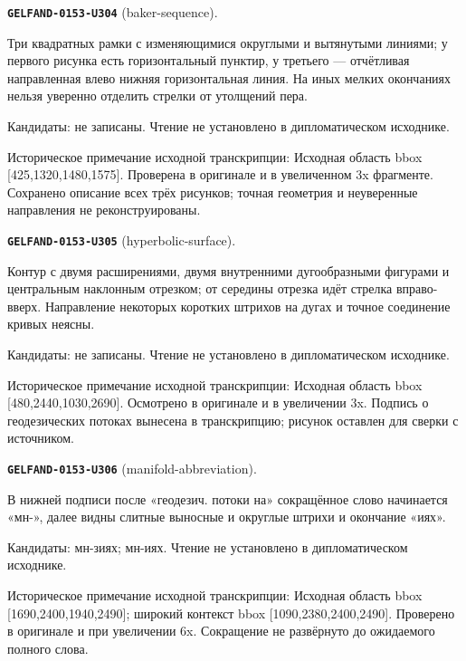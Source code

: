 \par\noindent\leavevmode{}\label{GELFAND-0153-U304}\textbf{\texttt{GELFAND-0153-U304}} (baker-sequence).\nopagebreak[4]\par
Три квадратных рамки с изменяющимися округлыми и вытянутыми линиями; у первого рисунка есть горизонтальный пунктир, у третьего — отчётливая направленная влево нижняя горизонтальная линия. На иных мелких окончаниях нельзя уверенно отделить стрелки от утолщений пера.\par
Кандидаты: не записаны. Чтение не установлено в дипломатическом исходнике.\par
Историческое примечание исходной транскрипции: Исходная область bbox [425,1320,1480,1575]. Проверена в оригинале и в увеличенном 3x фрагменте. Сохранено описание всех трёх рисунков; точная геометрия и неуверенные направления не реконструированы.\par\medskip
\par\noindent\leavevmode{}\label{GELFAND-0153-U305}\textbf{\texttt{GELFAND-0153-U305}} (hyperbolic-surface).\nopagebreak[4]\par
Контур с двумя расширениями, двумя внутренними дугообразными фигурами и центральным наклонным отрезком; от середины отрезка идёт стрелка вправо-вверх. Направление некоторых коротких штрихов на дугах и точное соединение кривых неясны.\par
Кандидаты: не записаны. Чтение не установлено в дипломатическом исходнике.\par
Историческое примечание исходной транскрипции: Исходная область bbox [480,2440,1030,2690]. Осмотрено в оригинале и в увеличении 3x. Подпись о геодезических потоках вынесена в транскрипцию; рисунок оставлен для сверки с источником.\par\medskip
\par\noindent\leavevmode{}\label{GELFAND-0153-U306}\textbf{\texttt{GELFAND-0153-U306}} (manifold-abbreviation).\nopagebreak[4]\par
В нижней подписи после «геодезич. потоки на» сокращённое слово начинается «мн-», далее видны слитные выносные и округлые штрихи и окончание «иях».\par
Кандидаты: мн-зиях; мн-иях. Чтение не установлено в дипломатическом исходнике.\par
Историческое примечание исходной транскрипции: Исходная область bbox [1690,2400,1940,2490]; широкий контекст bbox [1090,2380,2400,2490]. Проверено в оригинале и при увеличении 6x. Сокращение не развёрнуто до ожидаемого полного слова.\par\medskip
